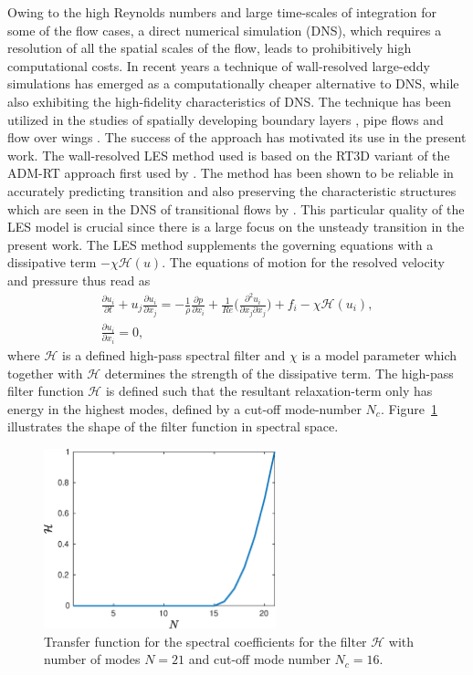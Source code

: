 Owing to the high Reynolds numbers and large time-scales of integration for some of the flow cases, a direct numerical simulation (DNS), which requires a resolution of all the spatial scales of the flow, leads to prohibitively high computational costs. In recent years a technique of wall-resolved large-eddy simulations has emerged as a computationally cheaper alternative to DNS, while also exhibiting the high-fidelity characteristics of DNS.
The technique has been utilized in the studies of spatially developing boundary layers \citep{eitel14}, pipe flows \citep{chin15} and flow over wings \citep{uzun10,lombard15}. The success of the approach has motivated its use in the present work. The wall-resolved LES method used is based on the RT3D variant of the ADM-RT approach first used by \cite{schlatter04}. The method has been shown to be reliable in accurately predicting transition and also preserving the characteristic structures which are seen in the DNS of transitional flows by \cite{schlatter06}. This particular quality of the LES model is crucial since there is a large focus on the unsteady transition in the present work. The LES method supplements the governing equations with a dissipative term $-\chi\mathcal{H}(u)$. The equations of motion for the resolved velocity and pressure thus read as
\begin{subequations}
	\label{eqn:rt_les}	
	\begin{eqnarray}
	\frac{\partial u_{i}}{\partial t} + u_{j}\frac{\partial u_{i}}{\partial x_{j}} =  - \frac{1}{\rho}\frac{\partial p}{\partial x_{i}} + \frac{1}{Re}\bigg(\frac{\partial^{2} u_{i}}{\partial x_{j}\partial x_{j}}  \bigg) + f_{i} -\chi\mathcal{H}(u_{i}), \\
	\frac{\partial u_{i}}{\partial x_{i}} = 0,
	\end{eqnarray}
\end{subequations}	
where $\mathcal{H}$ is a defined high-pass spectral filter and $\chi$ is a model parameter which together with $\mathcal{H}$ determines the strength of the dissipative term. The high-pass filter function $\mathcal{H}$ is defined such that the resultant relaxation-term only has energy in the highest modes, defined by a cut-off mode-number $N_{c}$. Figure~\ref{fig:filter_shape} illustrates the shape of the filter function in spectral space.
\begin{figure}[h]
	\centering
	\includegraphics[width=0.60\textwidth]{filter_shape}
	\caption{Transfer function for the spectral coefficients for the filter $\mathcal{H}$ with number of modes $N=21$ and cut-off mode number $N_{c}=16$.}
	\label{fig:filter_shape}
\end{figure}

